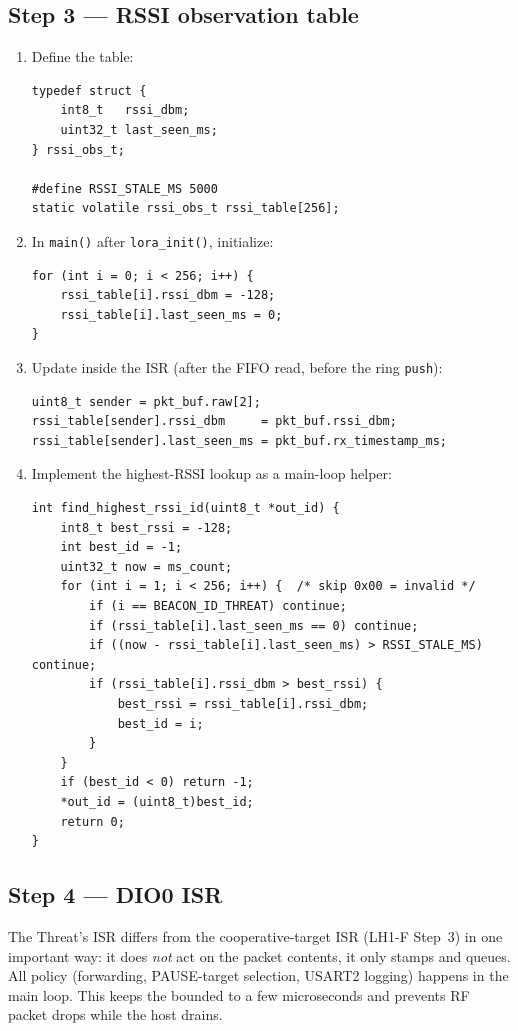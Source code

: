 \documentclass[11pt,letterpaper]{article}
\begin{document}
\subsection{Step 3 --- RSSI observation table}
\begin{enumerate}[leftmargin=2em]
	\item Define the table:
\begin{verbatim}
typedef struct {
    int8_t   rssi_dbm;
    uint32_t last_seen_ms;
} rssi_obs_t;

#define RSSI_STALE_MS 5000
static volatile rssi_obs_t rssi_table[256];
\end{verbatim}
	\item In \texttt{main()} after \texttt{lora\_init()}, initialize:
\begin{verbatim}
for (int i = 0; i < 256; i++) {
    rssi_table[i].rssi_dbm = -128;
    rssi_table[i].last_seen_ms = 0;
}
\end{verbatim}
	\item Update inside the ISR (after the FIFO read, before the ring \texttt{push}):
\begin{verbatim}
uint8_t sender = pkt_buf.raw[2];
rssi_table[sender].rssi_dbm     = pkt_buf.rssi_dbm;
rssi_table[sender].last_seen_ms = pkt_buf.rx_timestamp_ms;
\end{verbatim}
	\item Implement the highest-RSSI lookup as a main-loop helper:
\begin{verbatim}
int find_highest_rssi_id(uint8_t *out_id) {
    int8_t best_rssi = -128;
    int best_id = -1;
    uint32_t now = ms_count;
    for (int i = 1; i < 256; i++) {  /* skip 0x00 = invalid */
        if (i == BEACON_ID_THREAT) continue;
        if (rssi_table[i].last_seen_ms == 0) continue;
        if ((now - rssi_table[i].last_seen_ms) > RSSI_STALE_MS) continue;
        if (rssi_table[i].rssi_dbm > best_rssi) {
            best_rssi = rssi_table[i].rssi_dbm;
            best_id = i;
        }
    }
    if (best_id < 0) return -1;
    *out_id = (uint8_t)best_id;
    return 0;
}
\end{verbatim}
\end{enumerate}

\subsection{Step 4 --- DIO0 ISR}

The Threat's ISR differs from the cooperative-target ISR (LH1-F Step~3) in one important way: it does \emph{not} act on the packet contents, it only stamps and queues. All policy (forwarding, PAUSE-target selection, USART2 logging) happens in the main loop. This keeps the \ISR{} bounded to a few microseconds and prevents \mbox{RF} packet drops while the host \UART{} drains.
\end{document}
